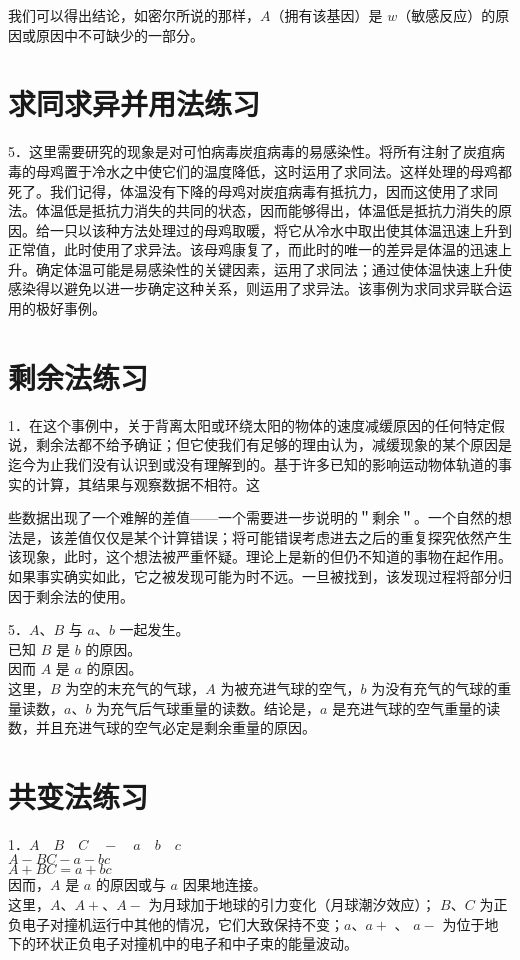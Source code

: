 我们可以得出结论，如密尔所说的那样，$A$（拥有该基因）是 $w$（敏感反应）的原因或原因中不可缺少的一部分。

\section*{求同求异并用法练习}
5．这里需要研究的现象是对可怕病毒炭疽病毒的易感染性。将所有注射了炭疽病毒的母鸡置于冷水之中使它们的温度降低，这时运用了求同法。这样处理的母鸡都死了。我们记得，体温没有下降的母鸡对炭疽病毒有抵抗力，因而这使用了求同法。体温低是抵抗力消失的共同的状态，因而能够得出，体温低是抵抗力消失的原因。给一只以该种方法处理过的母鸡取暖，将它从冷水中取出使其体温迅速上升到正常值，此时使用了求异法。该母鸡康复了，而此时的唯一的差异是体温的迅速上升。确定体温可能是易感染性的关键因素，运用了求同法；通过使体温快速上升使感染得以避免以进一步确定这种关系，则运用了求异法。该事例为求同求异联合运用的极好事例。

\section*{剩余法练习}
1．在这个事例中，关于背离太阳或环绕太阳的物体的速度减缓原因的任何特定假说，剩余法都不给予确证；但它使我们有足够的理由认为，减缓现象的某个原因是迄今为止我们没有认识到或没有理解到的。基于许多已知的影响运动物体轨道的事实的计算，其结果与观察数据不相符。这

些数据出现了一个难解的差值——一个需要进一步说明的＂剩余＂。一个自然的想法是，该差值仅仅是某个计算错误；将可能错误考虑进去之后的重复探究依然产生该现象，此时，这个想法被严重怀疑。理论上是新的但仍不知道的事物在起作用。如果事实确实如此，它之被发现可能为时不远。一旦被找到，该发现过程将部分归因于剩余法的使用。

5．$A 、 B$ 与 $a 、 b$ 一起发生。\\
已知 $B$ 是 $b$ 的原因。\\
因而 $A$ 是 $a$ 的原因。\\
这里，$B$ 为空的末充气的气球，$A$ 为被充进气球的空气，$b$ 为没有充气的气球的重量读数，$a 、 b$ 为充气后气球重量的读数。结论是，$a$ 是充进气球的空气重量的读数，并且充进气球的空气必定是剩余重量的原因。

\section*{共变法练习}
1．$A \quad B \quad C \quad-\quad a \quad b \quad c$\\
$A-B C-a-b c$\\
$A+B C=a+b c$\\
因而，$A$ 是 $a$ 的原因或与 $a$ 因果地连接。\\
这里，$A 、 A+、 A-$ 为月球加于地球的引力变化（月球潮汐效应）； $B 、 C$ 为正负电子对撞机运行中其他的情况，它们大致保持不变；$a 、 a+$ 、 $a-$ 为位于地下的环状正负电子对撞机中的电子和中子束的能量波动。


